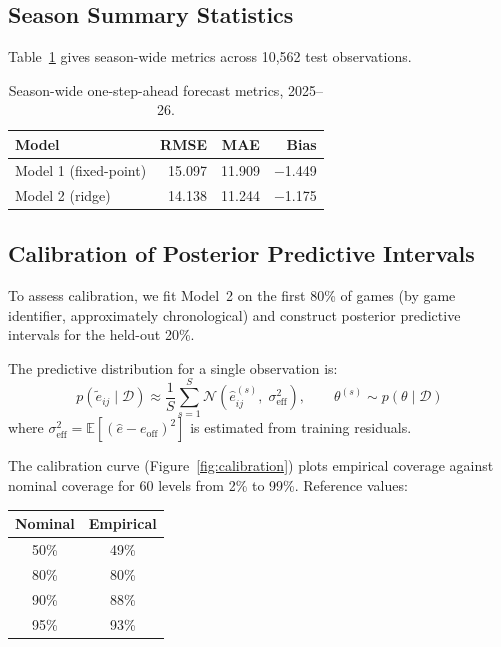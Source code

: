 \documentclass[11pt]{article}
\newcommand{\E}{\mathbb{E}}
\newcommand{\N}{\mathcal{N}}
\begin{document}
\subsection{Season Summary Statistics}
\label{sec:season_stats}

Table~\ref{tab:season_summary} gives season-wide metrics across 10{,}562
test observations.

\begin{table}[h]
\centering
\caption{Season-wide one-step-ahead forecast metrics, 2025--26.}
\label{tab:season_summary}
\begin{tabular}{lrrr}
\toprule
Model & RMSE & MAE & Bias \\
\midrule
Model 1 (fixed-point) & 15.097 & 11.909 & $-$1.449 \\
Model 2 (ridge)       & 14.138 & 11.244 & $-$1.175 \\
\bottomrule
\end{tabular}
\end{table}

\subsection{Calibration of Posterior Predictive Intervals}
\label{sec:calibration}

To assess calibration, we fit Model~2 on the first 80\% of games (by game
identifier, approximately chronological) and construct posterior predictive
intervals for the held-out 20\%.

The predictive distribution for a single observation is:
\begin{equation}
  p(\tilde{e}_{ij} \mid \mathcal{D}) \approx \frac{1}{S}\sum_{s=1}^S
  \N\!\left(\hat{e}_{ij}^{(s)},\; \sigma^2_{\text{eff}}\right),
  \qquad \theta^{(s)} \sim p(\theta \mid \mathcal{D})
  \label{eq:pp_mixture}
\end{equation}
where $\sigma^2_{\text{eff}} = \E[(\hat{e} - e_{\text{off}})^2]$ is estimated
from training residuals.

The calibration curve (Figure~\ref{fig:calibration}) plots empirical coverage
against nominal coverage for 60 levels from 2\% to 99\%.  Reference values:

\begin{center}
\begin{tabular}{cc}
\toprule
Nominal & Empirical \\
\midrule
50\% & 49\% \\
80\% & 80\% \\
90\% & 88\% \\
95\% & 93\% \\
\bottomrule
\end{tabular}
\end{center}
\end{document}
